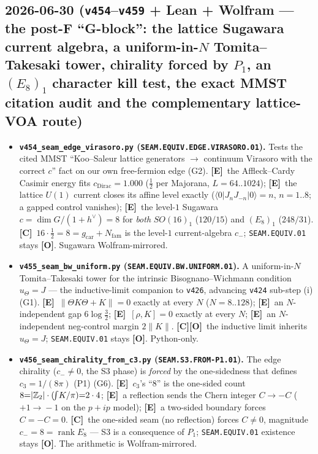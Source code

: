 \documentclass[11pt]{article}
\providecommand{\mE}{\textbf{[E]}}\providecommand{\mC}{\textbf{[C]}}
\providecommand{\mO}{\textbf{[O]}}\providecommand{\mX}{\textbf{[X]}}
\providecommand{\gcar}{g_{\mathrm{car}}}\providecommand{\Nfam}{N_{\mathrm{fam}}}
\begin{document}
\subsection*{2026-06-30 (\texttt{v454}--\texttt{v459} + Lean + Wolfram --- the post-F ``G-block'': the lattice Sugawara current algebra, a uniform-in-$N$ Tomita--Takesaki tower, chirality forced by $P_1$, an $(E_8)_1$ character kill test, the exact MMST citation audit and the complementary lattice-VOA route)}
\begin{itemize}
\item \textbf{\texttt{v454\_seam\_edge\_virasoro.py} (\texttt{SEAM.EQUIV.EDGE.VIRASORO.01}).} Tests the cited MMST
``Koo--Saleur lattice generators $\to$ continuum Virasoro with the correct $c$'' fact on our own free-fermion edge
(G2). \mE\ the Affleck--Cardy Casimir energy fits $c_{\mathrm{Dirac}}{=}1.000$ ($\tfrac12$ per Majorana, $L{=}64..1024$);
\mE\ the lattice $U(1)$ current closes its affine level exactly ($\langle0|J_nJ_{-n}|0\rangle{=}n$, $n{=}1..8$; a gapped
control vanishes); \mE\ the level-$1$ Sugawara $c{=}\dim G/(1{+}h^\vee){=}8$ for \emph{both} $SO(16)_1$ ($120/15$) and
$(E_8)_1$ ($248/31$). \mC\ $16{\cdot}\tfrac12{=}8{=}\gcar{+}\Nfam$ is the level-$1$ current-algebra $c_-$;
\texttt{SEAM.EQUIV.01} stays \mO. Sugawara Wolfram-mirrored.
\item \textbf{\texttt{v455\_seam\_bw\_uniform.py} (\texttt{SEAM.EQUIV.BW.UNIFORM.01}).} A uniform-in-$N$
Tomita--Takesaki tower for the intrinsic Bisognano--Wichmann condition $u_\Theta{=}J$ --- the inductive-limit companion
to \texttt{v426}, advancing \texttt{v424} sub-step (i) (G1). \mE\ $\|\Theta K\Theta{+}K\|{=}0$ exactly at every $N$
($N{=}8..128$); \mE\ an $N$-independent gap $6\log\tfrac32$; \mE\ $[\rho,K]{=}0$ exactly at every $N$; \mE\ an
$N$-independent neg-control margin $2\|K\|$. \mC\mO\ the inductive limit inherits $u_\Theta{=}J$;
\texttt{SEAM.EQUIV.01} stays \mO. Python-only.
\item \textbf{\texttt{v456\_seam\_chirality\_from\_c3.py} (\texttt{SEAM.S3.FROM-P1.01}).} The edge chirality
($c_-{\neq}0$, the S3 phase) is \emph{forced} by the one-sidedness that defines $c_3{=}1/(8\pi)$ (P1) (G6). \mE\
$c_3$'s ``$8$'' is the one-sided count $8{=}|\mathbb{Z}_2|\cdot(\!\int\!K/\pi){=}2\cdot4$; \mE\ a reflection sends the Chern
integer $C{\to}{-}C$ ($+1\!\to\!-1$ on the $p{+}ip$ model); \mE\ a two-sided boundary forces $C{=}{-}C{=}0$. \mC\ the
one-sided seam (no reflection) forces $C{\neq}0$, magnitude $c_-{=}8{=}\operatorname{rank}E_8$ --- S3 is a consequence
of $P_1$; \texttt{SEAM.EQUIV.01} existence stays \mO. The arithmetic is Wolfram-mirrored.

\end{itemize}
\end{document}
